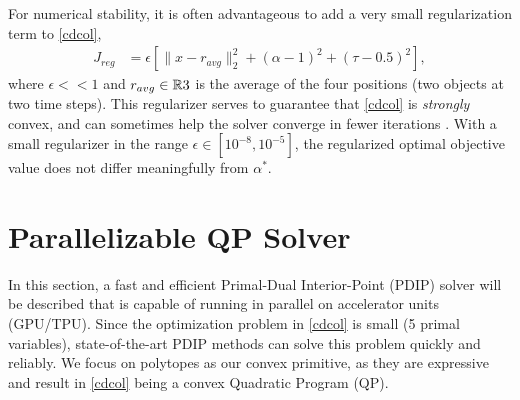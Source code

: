 For numerical stability, it is often advantageous to add a very small regularization term to \eqref{cdcol},
%
\begin{align}
    J_{{reg}} &= \epsilon [\|x - r_{avg}\|_2^2 + (\alpha - 1)^2 + (\tau - 0.5)^2 ],
\end{align}
%
where $\epsilon << 1$ and $r_{avg} \in \mathbb{R}{3}$ is the average of the four positions (two objects at two time steps). This regularizer serves to guarantee that \eqref{cdcol} is \textit{strongly} convex, and can sometimes help the solver converge in fewer iterations \cite{boyd2004,nocedal2006}. With a small regularizer in the range $\epsilon \in [10^{-8}, 10^{-5}]$, the regularized optimal objective value does not differ meaningfully from $\alpha^*$.
%
%
%
%
%
%
\section{Parallelizable QP Solver}\label{sec:cdcol:qp_solver}
%
%
%
%
In this section, a fast and efficient Primal-Dual Interior-Point (PDIP) solver will be described that is capable of running in parallel on accelerator units (GPU/TPU). Since the optimization problem in \eqref{cdcol} is small (5 primal variables), state-of-the-art PDIP methods can solve this problem quickly and reliably. We focus on polytopes as our convex primitive, as they are expressive and result in \eqref{cdcol} being a convex Quadratic Program (QP).  

